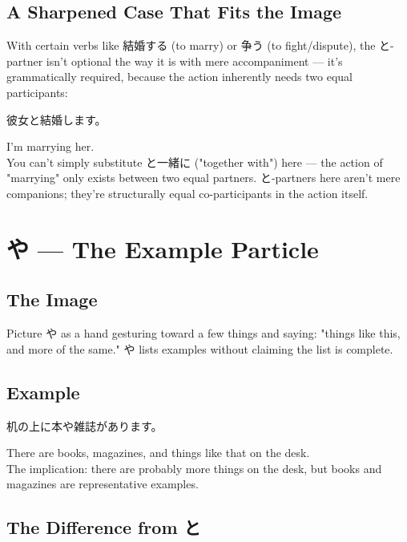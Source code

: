\documentclass[12pt]{book}
\begin{document}
\section*{A Sharpened Case That Fits the Image}

With certain verbs like 結婚する (to marry) or 争う (to fight/dispute), the と-partner isn't optional the way it is with mere accompaniment — it's grammatically required, because the action inherently needs two equal participants:

\par\quad 彼女と結婚します。\\
\par\quad I'm marrying her.\\

You can't simply substitute と一緒に ("together with") here — the action of "marrying" only exists between two equal partners. と-partners here aren't mere companions; they're structurally equal co-participants in the action itself.


\chapter{や — The Example Particle}

\section*{The Image}

Picture や as a hand gesturing toward a few things and saying: "things like this, and more of the same." や lists examples without claiming the list is complete.

\section*{Example}

\par\quad 机の上に本や雑誌があります。\\
\par\quad There are books, magazines, and things like that on the desk.\\

The implication: there are probably more things on the desk, but books and magazines are representative examples.

\section*{The Difference from と}
\end{document}
